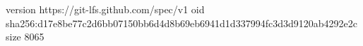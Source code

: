 version https://git-lfs.github.com/spec/v1
oid sha256:d17e8be77c2d6bb07150bb6d4d8b69eb6941d1d337994fc3d3d9120ab4292e2c
size 8065
